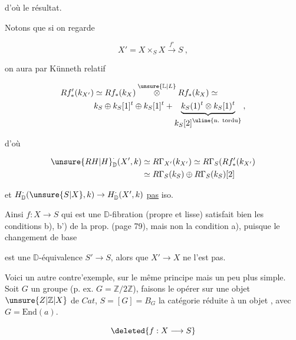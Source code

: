 d'où le résultat.

Notons que si on regarde

\[
X'=X\times_S X\xrightarrow{f'}S\ ,
\]

on aura par Künneth relatif

\[
\begin{aligned}
Rf'_*(k_{X'})&\simeq Rf_*(k_X)\mathbin{\overset{\unsure{\mathbb L|L}}{\otimes}}Rf_*(k_X)\simeq\\
&k_S\oplus k_S[1]^t\oplus k_S[1]^t+
\underbrace{k_S(1)^t\otimes k_S[1)^t}_{\displaystyle k_S[2]^{\text{\uline{n. tordu}}}}\, ,
\end{aligned}
\]

 d'où

\[
\begin{aligned}
\unsure{R H|H}^{\cdot}_{\mathbb D}(X',k)&\simeq R\Gamma_{X'}(k_{X'})\simeq R\Gamma_S(Rf'_*(k_{X'})\\
&\simeq R\Gamma_S(k_S)\oplus R\Gamma_S(k_S)[2]
\end{aligned}
\]

et $H^{\cdot}_{\mathbb D}(\unsure{S|X},k)\to H^{\cdot}_{\mathbb D}(X',k)$  \uline{pas} iso.


Ainsi $f:X\longrightarrow S$ qui est une $\mathbb D$-fibration (propre et lisse) satisfait bien les conditions  b), b') de la prop.  (page 79), mais non la condition a), puisque le changement de base


est une $\mathbb D$-équivalence $S'\to S$, alors que $X'\to X$ ne l'est pas.

Voici un autre contre'exemple, sur le même principe mais un peu plus simple. Soit $G$ un groupe   (p. ex. $G=\mathbb Z/2\mathbb Z$), faisons le opérer sur une  objet $\unsure{Z|\mathbb Z|X}$ de $\mathit{Cat}$,  $S=[G]=B_G$ la catégorie réduite à un objet , avec $G=\mathrm{End}(a)$.


\[
\deleted{f:X\longrightarrow S}
\]

